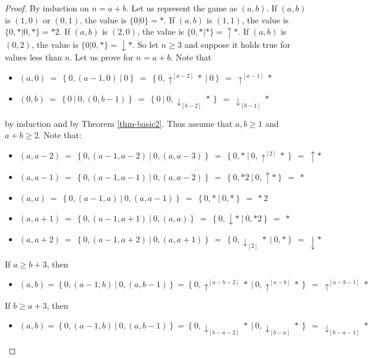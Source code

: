 \documentclass[10pt,a4paper]{amsart}
\begin{document}
\begin{proof}
By induction on $n=a+b$. Let us represent the game as $(a,b)$.
If $(a,b)$ is $(1,0)$ or $(0,1)$, the value is $\{0|0\}=*$.
If $(a,b)$ is $(1,1)$, the value is $\{0,*|0,*\}=*2$.
If $(a,b)$ is $(2,0)$, the value is $\{0,*|*\}=\uparrow*$.
If $(a,b)$ is $(0,2)$, the value is $\{0|0,*\}=\downarrow*$.
So let $n\geq 3$ and suppose it holds true for values less than $n$. Let us prove for $n=a+b$.
Note that
\begin{itemize}
\item $(a,0)\ =\ \left\{0,(a-1,0)\ \big|\ 0\right\}\ =\ \left\{0,\uparrow^{[a-2]}*\ \big|\ 0\right\}\ =\ \uparrow^{[a-1]}*$
\item $(0,b)\ =\ \left\{0\ \big|\ 0,(0,b-1)\right\}\ =\ \left\{0\ \big|\ 0,\downarrow_{[b-2]}*\right\}\ =\ \downarrow_{[b-1]}*$
\end{itemize}
by induction and by Theorem \ref{thm-basic2}.
Thus assume that $a,b\geq 1$ and $a+b\geq 2$.
Note that:
\begin{itemize}
\item $(a,a-2)\ =\ \left\{0,(a-1,a-2)\ \big|\ 0,(a,a-3)\right\}\ =\ \left\{0,*\ \big|\ 0,\uparrow^{[2]}*\right\}\ =\ \uparrow*$
\item $(a,a-1)\ =\ \left\{0,(a-1,a-1)\ \big|\ 0,(a,a-2)\right\}\ =\ \left\{0,*2\ \big|\ 0,\uparrow*\right\}\ =\ *$
\item $(a,a)\ =\ \left\{0,(a-1,a)\ \big|\ 0,(a,a-1)\right\}\ =\ \left\{0,*\ \big|\ 0,*\right\}\ =\ *2$
\item $(a,a+1)\ =\ \left\{0,(a-1,a+1)\ \big|\ 0,(a,a)\right\}\ =\ \left\{0,\downarrow*\ \big|\ 0,*2\right\}\ =\ *$
\item $(a,a+2)\ =\ \left\{0,(a-1,a+2)\ \big|\ 0,(a,a+1)\right\}\ =\ \left\{0,\downarrow_{[2]}*\ \big|\ 0,*\right\}\ =\ \downarrow*$
\end{itemize}
If $a\geq b+3$, then
\begin{itemize}
\item $(a,b) = \left\{0,(a-1,b)\ \big|\ 0,(a,b-1)\right\} = \left\{0,\uparrow^{[a-b-2]}*\ \big|\ 0,\uparrow^{[a-b]}*\right\}\ =\ \uparrow^{[a-b-1]}*$
\end{itemize}
If $b\geq a+3$, then
\begin{itemize}
\item $(a,b) = \left\{0,(a-1,b)\ \big|\ 0,(a,b-1)\right\} = \left\{0,\downarrow_{[b-a-2]}*\ \big|\ 0,\downarrow_{[b-a]}*\right\}\ =\ \downarrow_{[b-a-1]}*$
\end{itemize}
\end{proof}
\end{document}
